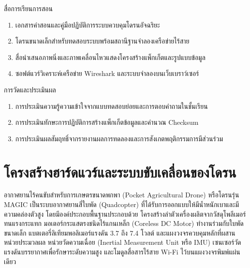 \begin{planbox}{สื่อการเรียนการสอน}
\begin{enumerate}
    \item เอกสารคำสอนและคู่มือปฏิบัติการระบบควบคุมโดรนอัจฉริยะ
    \item โดรนขนาดเล็กสำหรับทดสอบระบบพร้อมสถานีฐานจำลองเครือข่ายไร้สาย
    \item สื่อนำเสนอภาพนิ่งและภาพเคลื่อนไหวแสดงโครงสร้างแพ็กเก็ตและรูปแบบข้อมูล
    \item ซอฟต์แวร์วิเคราะห์เครือข่าย Wireshark และระบบจำลองบนเว็บเบราว์เซอร์
\end{enumerate}
\end{planbox}

\begin{planbox}{การวัดและประเมินผล}
\begin{enumerate}
    \item การประเมินความรู้ความเข้าใจจากแบบทดสอบย่อยและการตอบคำถามในชั้นเรียน
    \item การประเมินทักษะการปฏิบัติการสร้างแพ็กเก็ตข้อมูลและคำนวณ Checksum
    \item การประเมินผลสัมฤทธิ์จากรายงานผลการทดลองและการสังเกตพฤติกรรมการมีส่วนร่วม
\end{enumerate}
\end{planbox}

\clearpage

\section{โครงสร้างฮาร์ดแวร์และระบบขับเคลื่อนของโดรน}

อากาศยานไร้คนขับสำหรับการเกษตรขนาดพกพา (Pocket Agricultural Drone) หรือโดรนรุ่น MAGIC เป็นระบบอากาศยานสี่ใบพัด (Quadcopter) ที่ได้รับการออกแบบให้มีน้ำหนักเบาและมีความคล่องตัวสูง โดยมีองค์ประกอบพื้นฐานประกอบด้วย โครงสร้างลำตัวเครื่องผลิตจากวัสดุโพลีเมอร์ทนแรงกระแทก มอเตอร์กระแสตรงชนิดไร้แกนเหล็ก (Coreless DC Motor) ทำงานร่วมกับใบพัดขนาดเล็ก แบตเตอรี่ลิเทียมพอลิเมอร์แรงดัน 3.7 ถึง 7.4 โวลต์ และแผงวงจรควบคุมหลักที่ผสานหน่วยประมวลผล หน่วยวัดความเฉื่อย (Inertial Measurement Unit หรือ IMU) เซนเซอร์วัดแรงดันบรรยากาศเพื่อรักษาระดับความสูง และโมดูลสื่อสารไร้สาย Wi-Fi ไว้บนแผงวงจรพิมพ์แผ่นเดียว

